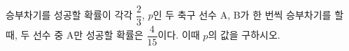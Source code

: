승부차기를 성공할 확률이 각각 $\dfrac{2}{3}$, $p$인 두 축구 선수 A, B가 한 번씩 승부차기를 할 때, 두 선수 중 A만 성공할 확률은 $\dfrac{4}{15}$이다. 이때 $p$의 값을 구하시오.

